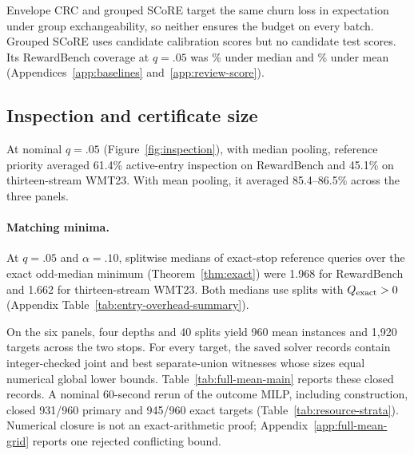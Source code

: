 \documentclass[11pt]{article}
\begin{document}
Envelope CRC \citep{yeh2025conformal} and grouped SCoRE target the same churn loss in expectation under group exchangeability, so neither ensures the budget on every batch. Grouped SCoRE uses candidate calibration scores but no candidate test scores. Its RewardBench coverage at $q=.05$ was \scoreRbMedianCov\% under median and \scoreRbMeanCov\% under mean (Appendices~\ref{app:baselines} and~\ref{app:review-score}).

\subsection{Inspection and certificate size}

At nominal $q=.05$ (Figure~\ref{fig:inspection}), with median pooling, reference priority averaged 61.4\% active-entry inspection on RewardBench and 45.1\% on thirteen-stream WMT23. With mean pooling, it averaged 85.4--86.5\% across the three panels.


\paragraph{Matching minima.} At $q=.05$ and $\alpha=.10$, splitwise medians of exact-stop reference queries over the exact odd-median minimum (Theorem~\ref{thm:exact}) were 1.968 for RewardBench and 1.662 for thirteen-stream WMT23. Both medians use splits with $Q_{\rm exact}>0$ (Appendix Table~\ref{tab:entry-overhead-summary}).

On the six panels, four depths and 40 splits yield 960 mean instances and 1,920 targets across the two stops. For every target, the saved solver records contain integer-checked joint and best separate-union witnesses whose sizes equal numerical global lower bounds. Table~\ref{tab:full-mean-main} reports these closed records. A nominal 60-second rerun of the outcome MILP, including construction, closed 931/960 primary and 945/960 exact targets (Table~\ref{tab:resource-strata}). Numerical closure is not an exact-arithmetic proof; Appendix~\ref{app:full-mean-grid} reports one rejected conflicting bound.
\end{document}
